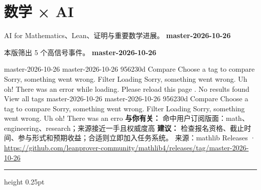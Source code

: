 \documentclass[10.5pt]{ctexart}
\begin{document}
\section*{数学 × AI}
{\color{ormuted} AI for Mathematics、Lean、证明与重要数学进展。}
\vspace{2mm}
{\LARGE\bfseries master-2026-10-26}\par
\vspace{1mm}
{\color{ormuted} 本版筛出 5 个高信号事件。}
\vspace{3mm}
{\Large\bfseries master-2026-10-26}\par
master-2026-10-26 master-2026-10-26 956230d Compare Choose a tag to compare Sorry, something went wrong. Filter Loading Sorry, something went wrong. Uh oh! There was an error while loading. Please reload this page . No results found View all tags master-2026-10-26 master-2026-10-26 956230d Compare Choose a tag to compare Sorry, something went wrong. Filter Loading Sorry, something went wrong. Uh oh! There was an erro
\textbf{与你有关：} 命中用户订阅版面：math、engineering、research；来源接近一手且权威度高
\textbf{建议：} 检查报名资格、截止时间、参与形式和预期收益；合适则立即加入任务系统。
{\footnotesize\color{ormuted} 来源：mathlib Releases · \url{https://github.com/leanprover-community/mathlib4/releases/tag/master-2026-10-26}}
\vspace{4mm}
\hrule height 0.25pt
\vspace{3mm}
\end{document}
